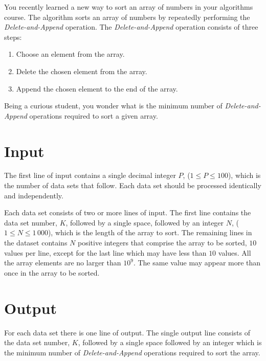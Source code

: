 
You recently learned a new way to sort an array of numbers in your algorithms course. The algorithm
sorts an array of numbers by repeatedly performing the \emph{Delete-and-Append} operation. The 
\emph{Delete-and-Append} operation consists of three steps:

\begin{enumerate}
\item Choose an element from the array.
\item Delete the chosen element from the array.
\item Append the chosen element to the end of the array.
\end{enumerate}

Being a curious student, you wonder what is the minimum number of \emph{Delete-and-Append} 
operations required to sort a given array.

\section*{Input}

The first line of input contains a single decimal integer $P$, ($1 \le P \le 100$), which is the number of
data sets that follow. Each data set should be processed identically and independently.

Each data set consists of two or more lines of input. The first line contains the data set number, $K$,
followed by a single space, followed by an integer $N$, ($1 \le N \le 1\,000$), which is the length of the
array to sort. The remaining lines in the dataset contains $N$ positive integers that comprise the array
to be sorted, $10$ values per line, except for the last line which may have less than $10$ values. All the
array elements are no larger than $10^9$. The same value may appear more than once in the array to
be sorted.

\section*{Output}

For each data set there is one line of output. The single output line consists of the data set number,
$K$, followed by a single space followed by an integer which is the minimum number of \emph{Delete-and-Append}
operations required to sort the array.

